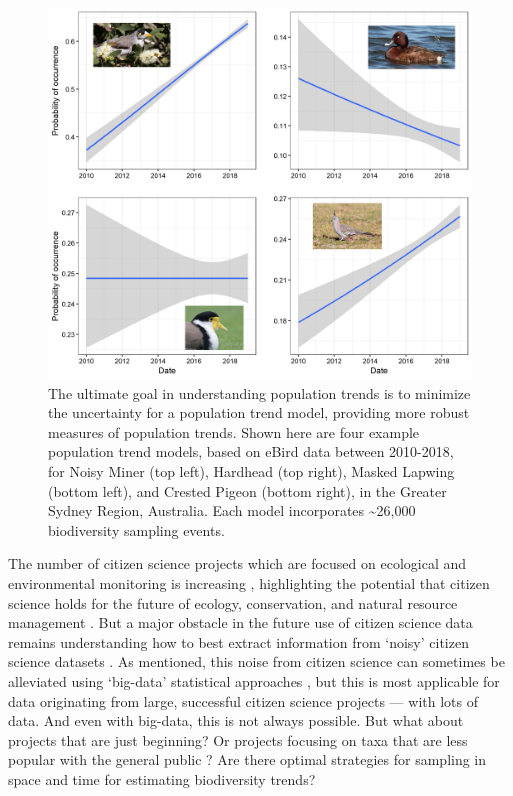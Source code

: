 \documentclass[9pt,twocolumn,twoside,lineno]{pnas-new}
\begin{document}
\begin{figure}[!hb]
\centering
\includegraphics[width=.8\linewidth]{glm_examples_edited.png}
\caption{The ultimate goal in understanding population trends is to minimize the uncertainty for a population trend model, providing more robust measures of population trends. Shown here are four example population trend models, based on eBird data between 2010-2018, for Noisy Miner (top left), Hardhead (top right), Masked Lapwing (bottom left), and Crested Pigeon (bottom right), in the Greater Sydney Region, Australia. Each model incorporates \textasciitilde 26,000 biodiversity sampling events.}
\label{fig1}
\end{figure}

The number of citizen science projects which are focused on ecological and environmental monitoring is increasing \cite{pocock2017diversity, theobald2015global}, highlighting the potential that citizen science holds for the future of ecology, conservation, and natural resource management \cite{pocock2018vision, silvertown2009new, soroye2018opportunistic, mckinley2017citizen}. But a major obstacle in the future use of citizen science data remains understanding how to best extract information from `noisy' citizen science datasets \cite{parrish2018exposing}. As mentioned, this noise from citizen science \cite{bird2014statistical} can sometimes be alleviated using `big-data' statistical approaches \cite{kelling2015taking}, but this is most applicable for data originating from large, successful citizen science projects --- with lots of data. And even with big-data, this is not always possible. But what about projects that are just beginning? Or projects focusing on taxa that are less popular with the general public \cite{mair2016explaining, ward2014understanding}? Are there optimal strategies for sampling in space and time for estimating biodiversity trends?
\end{document}
